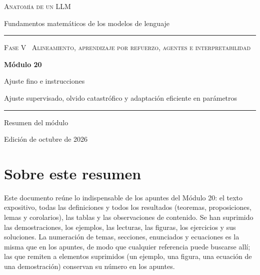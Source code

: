 \documentclass[11pt,a4paper,twoside,openany]{book}
\begin{document}
\frontmatter
\begin{titlepage}
\centering
\vspace*{2.5cm}
{\large\scshape Anatomía de un LLM}\par
\vspace{0.4cm}
{\normalsize Fundamentos matemáticos de los modelos de lenguaje}\par
\vspace{2.2cm}
\rule{\textwidth}{0.8pt}\par\vspace{0.5cm}
{\small\scshape Fase V \textperiodcentered\ Alineamiento, aprendizaje por refuerzo, agentes e interpretabilidad}\par\vspace{0.3cm}
{\Huge\bfseries Módulo 20\par}\vspace{0.3cm}
{\LARGE Ajuste fino e instrucciones\par}
\vspace{0.2cm}
{\large Ajuste supervisado, olvido catastrófico y adaptación eficiente en parámetros\par}
\vspace{0.5cm}\rule{\textwidth}{0.4pt}\par
\vspace{1.6cm}
{\large Resumen del módulo}\par
\vfill
{\small Edición de octubre de 2026}\par
\end{titlepage}

\chapter*{Sobre este resumen}

Este documento reúne lo indispensable de los apuntes del Módulo 20: el texto expositivo, todas las definiciones y todos los resultados (teoremas, proposiciones, lemas y corolarios), las tablas y las observaciones de contenido. Se han suprimido las demostraciones, los ejemplos, las lecturas, las figuras, los ejercicios y sus soluciones. La numeración de temas, secciones, enunciados y ecuaciones es la misma que en los apuntes, de modo que cualquier referencia puede buscarse allí; las que remiten a elementos suprimidos (un ejemplo, una figura, una ecuación de una demostración) conservan su número en los apuntes.
\end{document}
